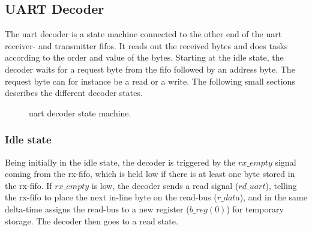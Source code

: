 \documentclass[main.tex]{subfiles}
\begin{document}
\subsection{UART Decoder}
The \gls{uart} decoder is a state machine connected to the other end of the \gls{uart} receiver- and transmitter \glspl{fifo}. It reads out the received bytes and does tasks according to the order and value of the bytes. Starting at the idle state, the decoder waits for a request byte from the fifo followed by an address byte. The request byte can for instance be a read or a write. The following small sections describes the different decoder states. 

\begin{figure}[!htp]
\begin{center}
\caption{\gls{uart} decoder state machine.}
\label{fig:uartdec}
\end{center}
\end{figure}

\subsubsection{Idle state}
Being initially in the idle state, the decoder is triggered by the $rx\_empty$ signal coming from the rx-fifo, which is held low if there is at least one byte stored in the rx-fifo. If $rx\_empty$ is low, the decoder sends a read signal ($rd\_uart$), telling the rx-fifo to place the next in-line byte on the read-bus ($r\_data$), and in the same delta-time assigns the read-bus to a new register ($b\_reg(0)$) for temporary storage. The decoder then goes to a read state.
\end{document}
